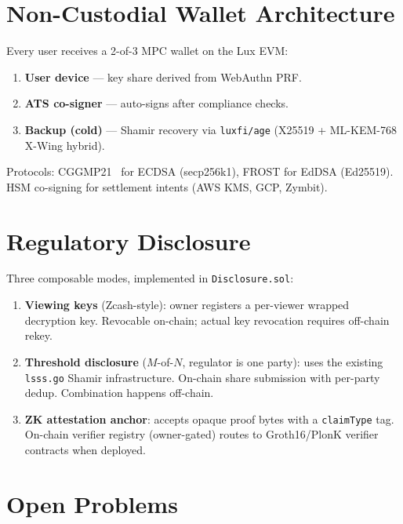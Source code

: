 \documentclass[11pt,a4paper]{article}
\begin{document}
\section{Non-Custodial Wallet Architecture}

Every user receives a 2-of-3 MPC wallet on the Lux EVM:

\begin{enumerate}[nosep]
  \item \textbf{User device} --- key share derived from WebAuthn PRF.
  \item \textbf{ATS co-signer} --- auto-signs after compliance checks.
  \item \textbf{Backup (cold)} --- Shamir recovery via
        \texttt{luxfi/age} (X25519 + ML-KEM-768 X-Wing hybrid).
\end{enumerate}

Protocols: CGGMP21~\cite{cggmp21} for ECDSA (secp256k1), FROST for
EdDSA (Ed25519). HSM co-signing for settlement intents
(AWS KMS, GCP, Zymbit).

\section{Regulatory Disclosure}

Three composable modes, implemented in \texttt{Disclosure.sol}:

\begin{enumerate}[nosep]
  \item \textbf{Viewing keys} (Zcash-style): owner registers a
        per-viewer wrapped decryption key. Revocable on-chain; actual
        key revocation requires off-chain rekey.
  \item \textbf{Threshold disclosure} ($M$-of-$N$, regulator is one
        party): uses the existing \texttt{lsss.go} Shamir infrastructure.
        On-chain share submission with per-party dedup. Combination
        happens off-chain.
  \item \textbf{ZK attestation anchor}: accepts opaque proof bytes
        with a \texttt{claimType} tag. On-chain verifier registry
        (owner-gated) routes to Groth16/PlonK verifier contracts when
        deployed.
\end{enumerate}

\section{Open Problems}
\end{document}
